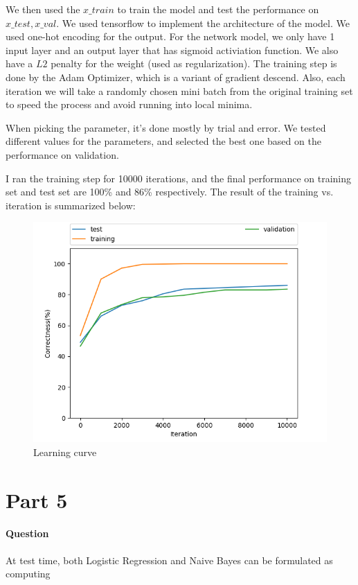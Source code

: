 \documentclass[11pt,twoside]{article}
\begin{document}
We then used the $x\_train$ to train the model and test the performance on $x\_test, x\_val$. We used tensorflow to implement the architecture of the model. We used one-hot encoding for the output. For the network model, we only have 1 input layer and an output layer that has sigmoid activiation function. We also have a $L2$ penalty for the weight (used as regularization). The training step is done by the Adam Optimizer, which is a variant of gradient descend. Also, each iteration we will take a randomly chosen mini batch from the original training set to speed the process and avoid running into local minima.

When picking the parameter, it's done mostly by trial and error. We tested different values for the parameters, and selected the best one based on the performance on validation.

I ran the training step for 10000 iterations, and the final performance on training set and test set are 100\% and 86\% respectively. The result of the training vs. iteration is summarized below:

\begin{figure}[h]
	\centering
	\includegraphics[scale=0.8]{part4.png}
	\caption*{Learning curve}
\end{figure}

\clearpage

\section*{Part 5}
\paragraph{Question}
At test time, both Logistic Regression and Naive Bayes can be formulated as computing
\end{document}
